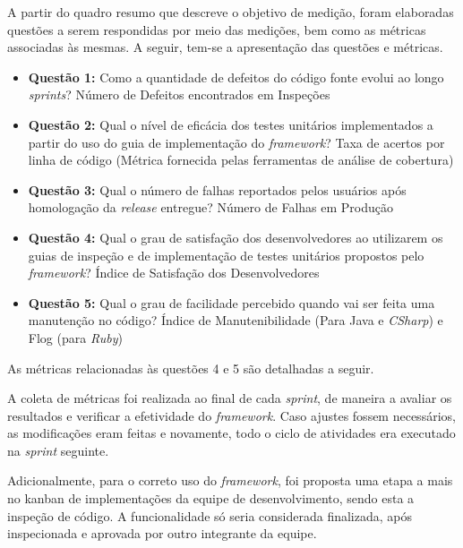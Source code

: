 \hfill \break

\hfill \break

A partir do quadro resumo que descreve o objetivo de medição, foram elaboradas questões a serem respondidas por meio das medições, bem como as métricas associadas às mesmas. A seguir, tem-se a apresentação das questões e métricas.

\begin{itemize}
	\item \textbf{Questão 1:} Como a quantidade de defeitos do código fonte evolui ao longo \textit{sprints}?
	\subitem Número de Defeitos encontrados em Inspeções

	\item \textbf{Questão 2:} Qual o nível de eficácia dos testes unitários implementados a partir do uso do guia de implementação do \textit{framework}?
	\subitem Taxa de acertos por linha de código (Métrica fornecida pelas ferramentas de análise de cobertura)

	\item \textbf{Questão 3:} Qual o número de falhas reportados pelos usuários após homologação da \textit{release} entregue?
	\subitem Número de Falhas em Produção

	\item \textbf{Questão 4:} Qual o grau de satisfação dos desenvolvedores ao utilizarem os guias de inspeção e de implementação de testes unitários propostos pelo \textit{framework}?
	\subitem Índice de Satisfação dos Desenvolvedores

	\item \textbf{Questão 5:} Qual o grau de facilidade percebido quando vai ser feita uma manutenção no código?
	\subitem Índice de Manutenibilidade (Para Java e \textit{CSharp}) e Flog (para \textit{Ruby})
\end{itemize}

As métricas relacionadas às questões 4 e 5 são detalhadas a seguir.

A coleta de métricas foi realizada ao final de cada \textit{sprint}, de maneira a avaliar os resultados e verificar a efetividade do \textit{framework}. Caso ajustes fossem necessários, as modificações eram feitas e novamente, todo o ciclo de atividades era executado na \textit{sprint} seguinte.

Adicionalmente, para o correto uso do \textit{framework}, foi proposta uma etapa a mais no kanban de implementações da equipe de desenvolvimento, sendo esta a inspeção de código. A funcionalidade só seria considerada finalizada, após inspecionada e aprovada por outro integrante da equipe.


